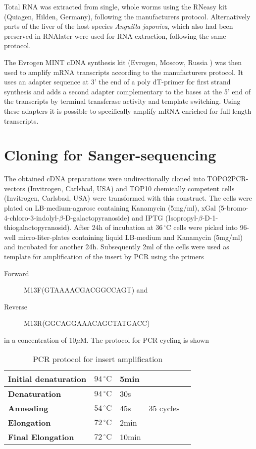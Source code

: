 Total RNA was extracted from single, whole worms using the RNeasy kit
(Quiagen, Hilden, Germany), following the manufacturers
protocol. Alternatively parts of the liver of the host species
\textit{Anguilla japonica}, which also had been preserved in RNAlater
were used for RNA extraction, following the same protocol.

The Evrogen MINT cDNA synthesis kit (Evrogen, Moscow, Russia ) was
then used to amplify mRNA transcripts according to the manufacturers
protocol. It uses an adapter sequence at 3' the end of a poly
dT-primer for first strand synthesis and adds a second adapter
complementary to the bases at the 5' end of the transcripts by
terminal transferase activity and template switching. Using these
adapters it is possible to specifically amplify mRNA enriched for
full-length transcripts.

\section{Cloning for Sanger-sequencing}

The obtained cDNA preparations were undirectionally cloned into
TOPO2PCR-vectors (Invitrogen, Carlsbad, USA) and TOP10 chemically
competent cells (Invitrogen, Carlsbad, USA) were transformed with this
construct. The cells were plated on LB-medium-agarose containing
Kanamycin (5mg/ml), xGal
(5-bromo-4-chloro-3-indolyl-$\beta$-D-galactopyranoside) and IPTG
(Isopropyl-$\beta$-D-1-thiogalactopyranosid). After 24h of incubation
at $36\,^{\circ}\mathrm{C} $ cells were picked into 96-well
micro-liter-plates containing liquid LB-medium and Kanamycin (5mg/ml)
and incubated for another 24h. Subsequently 2ml of the cells were used
as template for amplification of the insert by PCR using the primers
\begin{description}
\item[Forward] M13F(GTAAAACGACGGCCAGT) and
\item[Reverse] M13R(GGCAGGAAACAGCTATGACC)
\end{description}
in a concentration of 10$\mu$M. The protocol for PCR cycling is shown

\begin{table}[h]
  \centering
  \begin{tabular}{lllll} 
    \textbf{Initial denaturation} &  $ 94\, ^{\circ}\mathrm{C} $ & 5min &  &\\ 
    \hline
    \textbf{Denaturation} &  $ 94\, ^{\circ}\mathrm{C} $ &30s& & \\ 
    \textbf{Annealing} &   $ 54\, ^{\circ}\mathrm{C} $ & 45s & 35 cycles &\\ 
    \textbf{Elongation} &   $ 72\, ^{\circ}\mathrm{C} $ & 2min &  &\\ 
    \hline
    \textbf{Final Elongation} &   $ 72\, ^{\circ}\mathrm{C} $ & 10min &\\ 
  \end{tabular}   
  \caption{PCR protocol for insert amplification}
  \label{tab:PCR}
\end{table}

